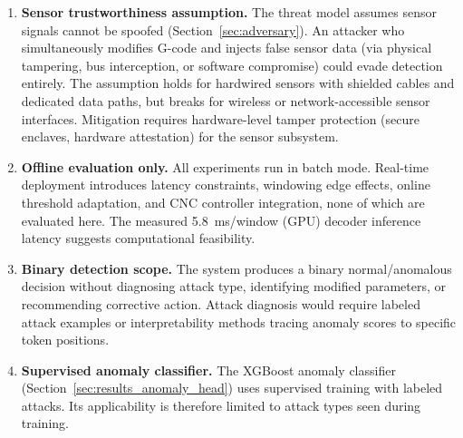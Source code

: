 \begin{enumerate}
    \item \textbf{Sensor trustworthiness assumption.}
    The threat model assumes sensor signals cannot be spoofed (Section~\ref{sec:adversary}).
    An attacker who simultaneously modifies G-code and injects false sensor data (via physical tampering, bus interception, or software compromise) could evade detection entirely.
    The assumption holds for hardwired sensors with shielded cables and dedicated data paths, but breaks for wireless or network-accessible sensor interfaces.
    Mitigation requires hardware-level tamper protection (secure enclaves, hardware attestation) for the sensor subsystem.

    \item \textbf{Offline evaluation only.}
    All experiments run in batch mode.
    Real-time deployment introduces latency constraints, windowing edge effects, online threshold adaptation, and CNC controller integration, none of which are evaluated here.
    The measured 5.8~ms/window (GPU) decoder inference latency suggests computational feasibility.

    \item \textbf{Binary detection scope.}
    The system produces a binary normal/anomalous decision without diagnosing attack type, identifying modified parameters, or recommending corrective action.
    Attack diagnosis would require labeled attack examples or interpretability methods tracing anomaly scores to specific token positions.

    \item \textbf{Supervised anomaly classifier.}
    The XGBoost anomaly classifier (Section~\ref{sec:results_anomaly_head}) uses supervised training with labeled attacks.
    Its applicability is therefore limited to attack types seen during training.
\end{enumerate}
